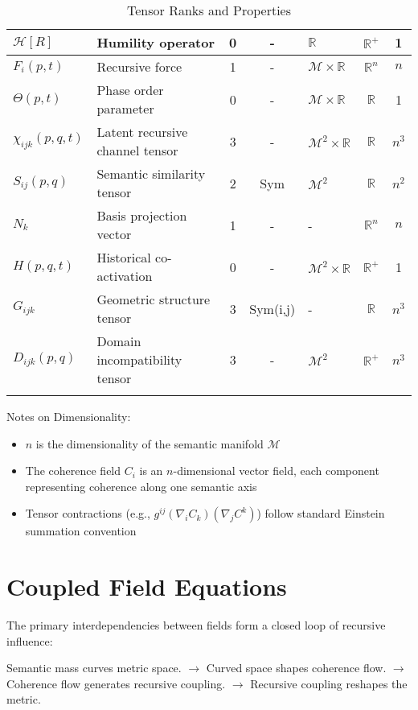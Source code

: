 {\begin{longtable}{|p{2.5cm}|p{4cm}|c|c|p{2.5cm}|c|c|}
\hline
\(\mathcal{H}[R]\) & Humility operator & 0 & - & \(\mathbb{R}\) & \(\mathbb{R}^+\) & 1 \\
\hline
\(F_i(p,t)\) & Recursive force & 1 & - & \(\mathcal{M} \times \mathbb{R}\) & \(\mathbb{R}^n\) & \(n\) \\
\hline
\(\Theta(p,t)\) & Phase order parameter & 0 & - & \(\mathcal{M} \times \mathbb{R}\) & \(\mathbb{R}\) & 1 \\
\hline
\(\chi_{ijk}(p,q,t)\) & Latent recursive channel tensor & 3 & - & \(\mathcal{M}^2 \times \mathbb{R}\) & \(\mathbb{R}\) & \(n^3\) \\
\hline
\(S_{ij}(p,q)\) & Semantic similarity tensor & 2 & Sym & \(\mathcal{M}^2\) & \(\mathbb{R}\) & \(n^2\) \\
\hline
\(N_k\) & Basis projection vector & 1 & - & - & \(\mathbb{R}^n\) & \(n\) \\
\hline
\(H(p,q,t)\) & Historical co-activation & 0 & - & \(\mathcal{M}^2 \times \mathbb{R}\) & \(\mathbb{R}^+\) & 1 \\
\hline
\(G_{ijk}\) & Geometric structure tensor & 3 & Sym(i,j) & - & \(\mathbb{R}\) & \(n^3\) \\
\hline
\(D_{ijk}(p,q)\) & Domain incompatibility tensor & 3 & - & \(\mathcal{M}^2\) & \(\mathbb{R}^+\) & \(n^3\) \\
\hline
\caption{Tensor Ranks and Properties}
\end{longtable}
}

Notes on Dimensionality:
\begin{itemize}
    \item \(n\) is the dimensionality of the semantic manifold \(\mathcal{M}\)
    \item The coherence field \(C_i\) is an \(n\)-dimensional vector field, each component representing coherence along one semantic axis
    \item Tensor contractions (e.g., \(g^{ij}(\nabla_i C_k)(\nabla_j C^k)\)) follow standard Einstein summation convention
\end{itemize}

\section{Coupled Field Equations}

The primary interdependencies between fields form a closed loop of recursive influence:

Semantic mass curves metric space. $\rightarrow$ Curved space shapes coherence flow. $\rightarrow$ Coherence flow generates recursive coupling. $\rightarrow$ Recursive coupling reshapes the metric.


